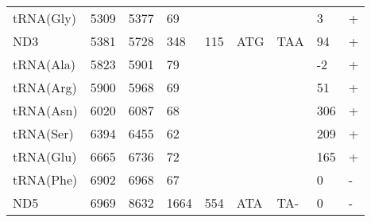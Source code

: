 \documentclass[../DISSERTACAO_MAIN.tex]{subfiles}
\begin{document}
\begin{longtable}{llllllllllllllllllllll}
			tRNA(Gly)    & 5309           & \multicolumn{2}{l}{5377}  & \multicolumn{2}{l}{69}         & \multicolumn{3}{l}{}                          & \multicolumn{3}{l}{}              & \multicolumn{3}{l}{}      & \multicolumn{3}{l}{3}           & \multicolumn{4}{l}{+}                  \\
			ND3          & 5381           & \multicolumn{2}{l}{5728}  & \multicolumn{2}{l}{348}        & \multicolumn{3}{l}{115}                       & \multicolumn{3}{l}{ATG}           & \multicolumn{3}{l}{TAA}   & \multicolumn{3}{l}{94}          & \multicolumn{4}{l}{+}                  \\
			tRNA(Ala)    & 5823           & \multicolumn{2}{l}{5901}  & \multicolumn{2}{l}{79}         & \multicolumn{3}{l}{}                          & \multicolumn{3}{l}{}              & \multicolumn{3}{l}{}      & \multicolumn{3}{l}{-2}          & \multicolumn{4}{l}{+}                  \\
			tRNA(Arg)    & 5900           & \multicolumn{2}{l}{5968}  & \multicolumn{2}{l}{69}         & \multicolumn{3}{l}{}                          & \multicolumn{3}{l}{}              & \multicolumn{3}{l}{}      & \multicolumn{3}{l}{51}          & \multicolumn{4}{l}{+}                  \\
			tRNA(Asn)    & 6020           & \multicolumn{2}{l}{6087}  & \multicolumn{2}{l}{68}         & \multicolumn{3}{l}{}                          & \multicolumn{3}{l}{}              & \multicolumn{3}{l}{}      & \multicolumn{3}{l}{306}         & \multicolumn{4}{l}{+}                  \\
			tRNA(Ser)    & 6394           & \multicolumn{2}{l}{6455}  & \multicolumn{2}{l}{62}         & \multicolumn{3}{l}{}                          & \multicolumn{3}{l}{}              & \multicolumn{3}{l}{}      & \multicolumn{3}{l}{209}         & \multicolumn{4}{l}{+}                  \\
			tRNA(Glu)    & 6665           & \multicolumn{2}{l}{6736}  & \multicolumn{2}{l}{72}         & \multicolumn{3}{l}{}                          & \multicolumn{3}{l}{}              & \multicolumn{3}{l}{}      & \multicolumn{3}{l}{165}         & \multicolumn{4}{l}{+}                  \\
			tRNA(Phe)    & 6902           & \multicolumn{2}{l}{6968}  & \multicolumn{2}{l}{67}         & \multicolumn{3}{l}{}                          & \multicolumn{3}{l}{}              & \multicolumn{3}{l}{}      & \multicolumn{3}{l}{0}           & \multicolumn{4}{l}{-}                  \\
			ND5          & 6969           & \multicolumn{2}{l}{8632}  & \multicolumn{2}{l}{1664}       & \multicolumn{3}{l}{554}                       & \multicolumn{3}{l}{ATA}           & \multicolumn{3}{l}{TA-}   & \multicolumn{3}{l}{0}           & \multicolumn{4}{l}{-}                  \\

\end{longtable}
\end{document}
